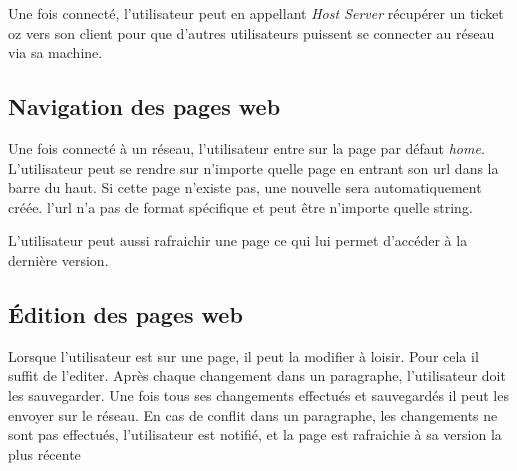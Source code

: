 \documentclass{article}
\begin{document}
	Une fois connecté, l'utilisateur peut en appellant \emph{Host Server}
	récupérer un ticket oz vers son client pour que d'autres utilisateurs
	puissent se connecter au réseau via sa machine. 
	
	\subsection{Navigation des pages web}
	Une fois connecté à un réseau, l'utilisateur entre sur la page par défaut
	\emph{home}. L'utilisateur peut se rendre sur n'importe quelle page en
	entrant son url dans la barre du haut. Si cette page n'existe pas, 
	une nouvelle sera automatiquement créée. l'url n'a pas de format spécifique
	et peut être n'importe quelle string. 
	
	L'utilisateur peut aussi rafraichir une page ce qui lui permet d'accéder
	à la dernière version.
	
	\subsection{Édition des pages web}
	Lorsque l'utilisateur est sur une page, il peut la modifier à loisir.
	Pour cela il suffit de l'editer. Après chaque changement dans un paragraphe,
	l'utilisateur doit les sauvegarder. Une fois tous ses changements
	effectués et sauvegardés il peut les envoyer sur le réseau. En cas
	de conflit dans un paragraphe, les changements ne sont pas effectués,
	l'utilisateur est notifié, et la page est rafraichie à sa version la plus
	récente 
	 
\end{document}
